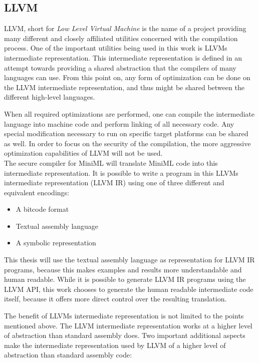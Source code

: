 \subsection{LLVM}
LLVM, short for \emph{Low Level Virtual Machine} is the name of a project providing many different and closely affiliated utilities concerned with the compilation process.
One of the important utilities being used in this work is LLVMs intermediate representation.
This intermediate representation is defined in an attempt towards providing a shared abstraction that the compilers of many languages can use.
From this point on, any form of optimization can be done on the LLVM intermediate representation, and thus might be shared between the different high-level languages.

When all required optimizations are performed, one can compile the intermediate language into machine code and perform linking of all necessary code.
Any special modification necessary to run on specific target platforms can be shared as well.
In order to focus on the security of the compilation, the more aggressive optimization capabilities of LLVM will not be used.
\\[1em]
The secure compiler for \mbox{MiniML} will translate \mbox{MiniML} code into this intermediate representation.
It is possible to write a program in this LLVMs intermediate representation (LLVM IR) using one of three different and equivalent encodings:
\begin{itemize}
\item A bitcode format
\item Textual assembly language
\item A symbolic representation
\end{itemize}

This thesis will use the textual assembly language as representation for LLVM IR programs, because this makes examples and results more understandable and human readable.
While it is possible to generate LLVM IR programs using the LLVM API, this work chooses to generate the human readable intermediate code itself, because it offers more direct control over the resulting translation.

The benefit of LLVMs intermediate representation is not limited to the points mentioned above.
The LLVM intermediate representation works at a higher level of abstraction than standard assembly does.
Two important additional aspects make the intermediate representation used by LLVM of a higher level of abstraction than standard assembly code:

